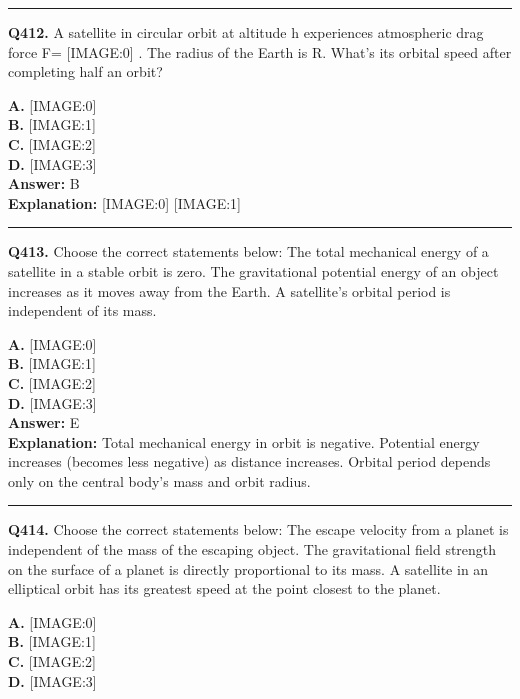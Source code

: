 \documentclass[12pt]{article}
\begin{document}
\hrule
\vspace{1em}


\noindent
\textbf{Q412.} A satellite in circular orbit at altitude h experiences atmospheric drag force F=
[IMAGE:0]
. The radius of the Earth is R. What's its orbital speed after completing half an orbit?



\textbf{A.} [IMAGE:0] \\
\textbf{B.} [IMAGE:1] \\
\textbf{C.} [IMAGE:2] \\
\textbf{D.} [IMAGE:3] \\

\textbf{Answer:} B \\
\textbf{Explanation:} [IMAGE:0]
[IMAGE:1]

\hrule
\vspace{1em}


\noindent
\textbf{Q413.} Choose the correct statements below:
The total mechanical energy of a satellite in a stable orbit is zero.
The gravitational potential energy of an object increases as it moves away from the Earth.
A satellite's orbital period is independent of its mass.



\textbf{A.} [IMAGE:0] \\
\textbf{B.} [IMAGE:1] \\
\textbf{C.} [IMAGE:2] \\
\textbf{D.} [IMAGE:3] \\

\textbf{Answer:} E \\
\textbf{Explanation:} Total mechanical energy in orbit is negative. Potential energy increases (becomes less negative) as distance increases. Orbital period depends only on the central body's mass and orbit radius.

\hrule
\vspace{1em}


\noindent
\textbf{Q414.} Choose the correct statements below:
The escape velocity from a planet is independent of the mass of the escaping object.
The gravitational field strength on the surface of a planet is directly proportional to its mass.
A satellite in an elliptical orbit has its greatest speed at the point closest to the planet.



\textbf{A.} [IMAGE:0] \\
\textbf{B.} [IMAGE:1] \\
\textbf{C.} [IMAGE:2] \\
\textbf{D.} [IMAGE:3] \\
\end{document}
